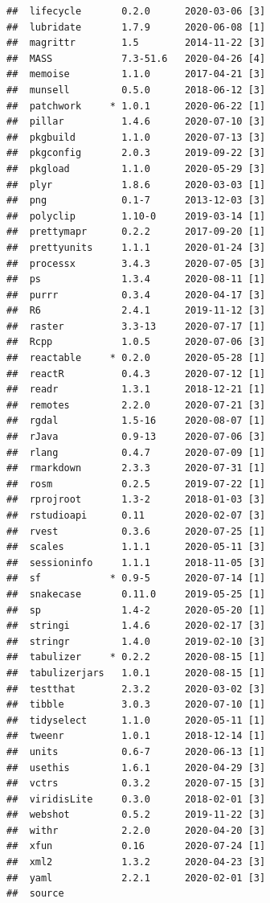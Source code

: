 \documentclass[
  french,
]{book}
\begin{document}
\begin{verbatim}
##  lifecycle       0.2.0      2020-03-06 [3]
##  lubridate       1.7.9      2020-06-08 [1]
##  magrittr        1.5        2014-11-22 [3]
##  MASS            7.3-51.6   2020-04-26 [4]
##  memoise         1.1.0      2017-04-21 [3]
##  munsell         0.5.0      2018-06-12 [3]
##  patchwork     * 1.0.1      2020-06-22 [1]
##  pillar          1.4.6      2020-07-10 [3]
##  pkgbuild        1.1.0      2020-07-13 [3]
##  pkgconfig       2.0.3      2019-09-22 [3]
##  pkgload         1.1.0      2020-05-29 [3]
##  plyr            1.8.6      2020-03-03 [1]
##  png             0.1-7      2013-12-03 [3]
##  polyclip        1.10-0     2019-03-14 [1]
##  prettymapr      0.2.2      2017-09-20 [1]
##  prettyunits     1.1.1      2020-01-24 [3]
##  processx        3.4.3      2020-07-05 [3]
##  ps              1.3.4      2020-08-11 [1]
##  purrr           0.3.4      2020-04-17 [3]
##  R6              2.4.1      2019-11-12 [3]
##  raster          3.3-13     2020-07-17 [1]
##  Rcpp            1.0.5      2020-07-06 [3]
##  reactable     * 0.2.0      2020-05-28 [1]
##  reactR          0.4.3      2020-07-12 [1]
##  readr           1.3.1      2018-12-21 [1]
##  remotes         2.2.0      2020-07-21 [3]
##  rgdal           1.5-16     2020-08-07 [1]
##  rJava           0.9-13     2020-07-06 [3]
##  rlang           0.4.7      2020-07-09 [1]
##  rmarkdown       2.3.3      2020-07-31 [1]
##  rosm            0.2.5      2019-07-22 [1]
##  rprojroot       1.3-2      2018-01-03 [3]
##  rstudioapi      0.11       2020-02-07 [3]
##  rvest           0.3.6      2020-07-25 [1]
##  scales          1.1.1      2020-05-11 [3]
##  sessioninfo     1.1.1      2018-11-05 [3]
##  sf            * 0.9-5      2020-07-14 [1]
##  snakecase       0.11.0     2019-05-25 [1]
##  sp              1.4-2      2020-05-20 [1]
##  stringi         1.4.6      2020-02-17 [3]
##  stringr         1.4.0      2019-02-10 [3]
##  tabulizer     * 0.2.2      2020-08-15 [1]
##  tabulizerjars   1.0.1      2020-08-15 [1]
##  testthat        2.3.2      2020-03-02 [3]
##  tibble          3.0.3      2020-07-10 [1]
##  tidyselect      1.1.0      2020-05-11 [1]
##  tweenr          1.0.1      2018-12-14 [1]
##  units           0.6-7      2020-06-13 [1]
##  usethis         1.6.1      2020-04-29 [3]
##  vctrs           0.3.2      2020-07-15 [3]
##  viridisLite     0.3.0      2018-02-01 [3]
##  webshot         0.5.2      2019-11-22 [3]
##  withr           2.2.0      2020-04-20 [3]
##  xfun            0.16       2020-07-24 [1]
##  xml2            1.3.2      2020-04-23 [3]
##  yaml            2.2.1      2020-02-01 [3]
##  source                                 

\end{verbatim}
\end{document}

